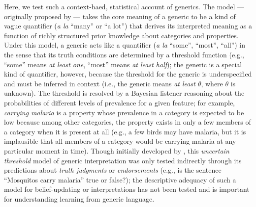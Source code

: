 \documentclass[floatsintext,doc]{apa6}
\begin{document}
Here, we test such a context-baed, statistical account of generics. 
The model --- originally proposed by  --- takes the core meaning of a generic to be a kind of vague quantifier (\emph{a la} ``many'' or ``a lot'') that derives its interpreted meaning as a function of richly structured prior knowledge about categories and properties. 
Under this model, a generic acts like a quantifier (\emph{a la} ``some'', ``most'', ``all'') in the sense that its truth conditions are determined by a threshold function (e.g., ``some'' means \emph{at least one},  ``most'' means \emph{at least half}); the generic is a special kind of quantifier, however, because the threshold for the generic is underspecified and must be inferred in context (i.e., the generic means \emph{at least $\theta$}, where $\theta$ is unknown).
The threshold is resolved by a Bayesian listener reasoning about the probabilities of different levels of prevalence for a given feature; for example, \emph{carrying malaria} is a property whose prevalence in a category is expected to be low because among other categories, the property exists in only a few members of a category when it is present at all (e.g., a few birds may have malaria, but it is implausible that all members of a category would be carrying malaria at any particular moment in time). 
Though initially developed  by , this \emph{uncertain threshold} model of generic interpretation was only tested indirectly through its predictions about \emph{truth judgments} or \emph{endorsements} (e.g., is the sentence \enquote{Mosquitos carry malaria} true or false?); the descriptive adequacy of such a model for belief-updating or interpretations has not been tested and is important for understanding learning from generic language.




\end{document}
